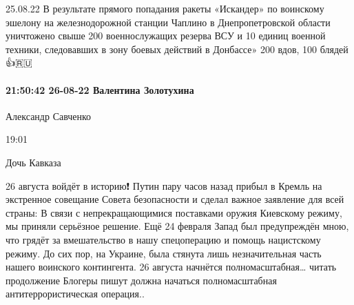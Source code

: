 25.08.22 В результате прямого попадания ракеты «Искандер» по воинскому эшелону
на железнодорожной станции Чаплино в Днепропетровской области уничтожено свыше
200 военнослужащих резерва ВСУ и 10 единиц военной техники, следовавших в зону
боевых действий в Донбассе» 200 вдов, 100 блядей 👍🇷🇺

\paragraph{21:50:42 26-08-22 Валентина Золотухина}

Александр Савченко

19:01

Дочь Кавказа

26 августа войдёт в историю❗️
Путин пару часов назад прибыл в Кремль на экстренное совещание Совета безопасности и сделал важное заявление для всей страны:
В связи с непрекращающимися поставками оружия Киевскому режиму, мы приняли серьёзное решение. Ещё 24 февраля Запад был предупреждён мною, что грядёт за вмешательство в нашу спецоперацию и помощь нацистскому режиму. До сих пор, на Украине, была стянута лишь незначительная часть нашего воинского контингента.
26 августа начнётся полномасштабная… читать продолжение
Блогеры пишут должна начаться полномасштабная антитеррористическая операция..

